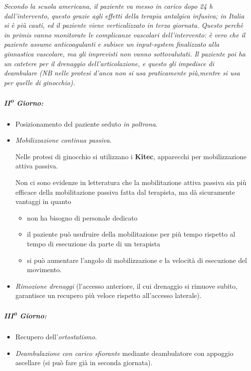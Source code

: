 \emph{Secondo la scuola americana, il paziente va messo in carico dopo
24 h dall'intervento, questo grazie agli effetti della terapia antalgica
infusiva; in Italia si è più cauti, ed il paziente viene verticalizzato
in terza giornata. Questo perchè in primis vanno monitorate le
complicanze vascolari dell'intervento: è vero che il paziente assume
anticoagulanti e subisce un input-system finalizzato alla ginnastica
vascolare, ma gli imprevisti non vanno sottovalutati. Il paziente poi ha
un catetere per il drenaggio dell'articolazione, e questo gli impedisce
di deambulare (NB nelle protesi d'anca non si usa praticamente
più,mentre si usa per quelle di ginocchio).}

\subparagraph{II\textsuperscript{o} Giorno:}

\begin{itemize}
\item
  Posizionamento del paziente seduto \emph{in poltrona}.
\item
  \emph{Mobilizzazione continua passiva}.

Nelle protesi di ginocchio si utilizzano i \textbf{Kitec}, apparecchi
per mobilizzazione attiva passiva.

Non ci sono evidenze in letteratura che la mobilitazione attiva passiva
sia più efficace della mobilitazione passiva fatta dal terapista, ma dà
sicuramente vantaggi in quanto


\begin{itemize}
\item
  non ha bisogno di personale dedicato
\item
  il paziente può usufruire della mobilitazione per più tempo rispetto
  al tempo di esecuzione da parte di un terapista
\item
  si può aumentare l'angolo di mobilizzazione e la velocità di
  esecuzione del movimento.
\end{itemize}

\item
  \emph{Rimozione drenaggi} (l'accesso anteriore, il cui drenaggio si
  rimuove subito, garantisce un recupero più veloce rispetto all'accesso
  laterale).
\end{itemize}
\subparagraph{III\textsuperscript{o} Giorno:}


\begin{itemize}
\item
  Recupero dell'\emph{ortostatismo}.
\item
  \emph{Deambulazione con carico sfiorante} mediante deambulatore con
  appoggio ascellare (si può fare già in seconda giornata).
\end{itemize}

